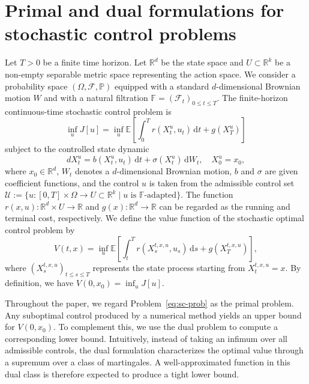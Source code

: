 \documentclass[11pt]{article}
\numberwithin{equation}{section}
\theoremstyle{plain}
\theoremstyle{definition}
\theoremstyle{remark}
\newcommand{\R}{\mathbb{R}}
\newcommand{\bE}{\mathbb{E}}
\newcommand{\dd}{\mathrm{d}}
\begin{document}
\section{Primal and dual formulations for stochastic control problems} \label{sec:problem}
Let $T>0$ be a finite time horizon. Let $\R^d$ be the state space and $U \subset \R^k$ be a non-empty separable metric space representing the action space. We consider a probability space $(\Omega, \mathcal{F}, \mathbb{P})$ equipped with a standard $d$-dimensional Brownian motion $W$ and with a natural filtration $\mathbb{F} = (\mathcal{F}_t)_{0\le t\le T}$. The finite-horizon continuous-time stochastic control problem is  
\begin{equation} \label{eq:sc-prob}
    \inf_{u} J[u] = \inf_{u} \bE\left[ \int_0^T r(X_t^u, u_t)\,\dd t + g(X_T^u) \right]
\end{equation}
subject to the controlled state dynamic 
\begin{equation} \label{eq:ito-dynamic}
    dX_t^u = b(X_t^u, u_t) \,\dd t + \sigma(X_t^u)\,\dd W_t, \quad X_0^u = x_0,
\end{equation}
where $x_0 \in \R^d$, $W_t$ denotes a $d$-dimensional Brownian motion, $b$ and $\sigma$ are given coefficient functions, and the control $u$ is taken from the admissible control set $\mathcal{U} := \{u:[0,T]\times \Omega \to U \subset \R^{k} \mid u \text{ is } \mathbb{F}\text{-adapted}\}$. 
The function $r(x, u): \R^d \times U \to \R$ and $g(x):\R^d \to \R$ can be regarded as the running and terminal cost, respectively. We define the value function of the stochastic optimal control problem by 
\begin{equation*}
    V(t, x) = \inf_u \bE\left[ \int_t^T r(X_s^{t, x, u}, u_s)\,\dd s + g(X_T^{t,x,u}) \right],
\end{equation*}
where $(X_s^{t, x, u})_{t\le s\le T}$ represents the state process starting from $X_t^{t,x,u} = x$. By definition, we have $V(0, x_0) = \inf_u J[u]$. 

Throughout the paper, we regard Problem~\eqref{eq:sc-prob} as the primal problem. Any suboptimal control produced by a numerical method yields an upper bound for $V(0,x_0)$. To complement this, we use the dual problem to compute a corresponding lower bound. Intuitively, instead of taking an infimum over all admissible controls, the dual formulation characterizes the optimal value through a supremum over a class of martingales. A well-approximated function in this dual class is therefore expected to produce a tight lower bound. 
\end{document}
